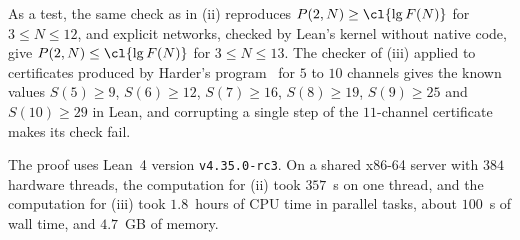 As a test, the same check as in (ii) reproduces $P(2,N)\ge\cl{\lg F(N)}$ for $3\le N\le12$, and explicit
networks, checked by Lean's kernel without native code, give $P(2,N)\le\cl{\lg F(N)}$ for $3\le N\le13$. The
checker of (iii) applied to certificates produced by Harder's program~\cite{HarRepo} for $5$ to $10$ channels
gives the known values $S(5)\ge9$, $S(6)\ge12$, $S(7)\ge16$, $S(8)\ge19$, $S(9)\ge25$ and $S(10)\ge29$ in Lean,
and corrupting a single step of the $11$-channel certificate makes its check fail.

The proof uses Lean~4 version \texttt{v4.35.0-rc3}. On a shared x86-64 server with $384$ hardware threads,
the computation for (ii) took $357$~s on one thread, and the computation for (iii) took $1.8$~hours of CPU time
in parallel tasks, about $100$~s of wall time, and $4.7$~GB of memory.
